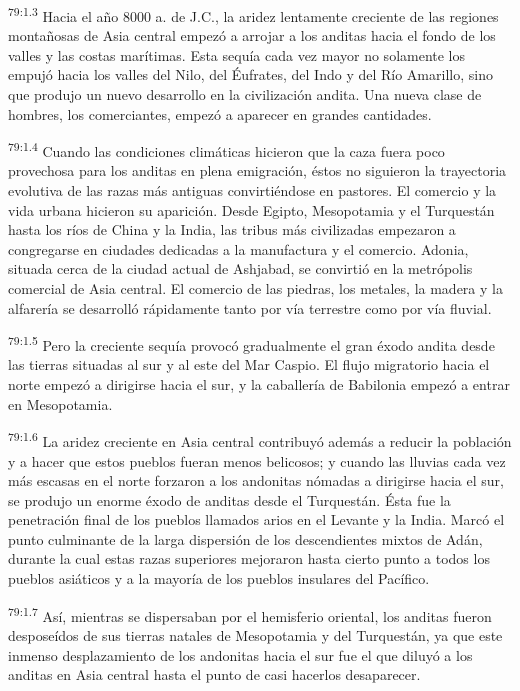 \par
\textsuperscript{79:1.3} Hacia el año 8000 a. de J.C., la aridez lentamente creciente de las regiones montañosas de Asia central empezó a arrojar a los anditas hacia el fondo de los valles y las costas marítimas. Esta sequía cada vez mayor no solamente los empujó hacia los valles del Nilo, del Éufrates, del Indo y del Río Amarillo, sino que produjo un nuevo desarrollo en la civilización andita. Una nueva clase de hombres, los comerciantes, empezó a aparecer en grandes cantidades.

\par
\textsuperscript{79:1.4} Cuando las condiciones climáticas hicieron que la caza fuera poco provechosa para los anditas en plena emigración, éstos no siguieron la trayectoria evolutiva de las razas más antiguas convirtiéndose en pastores. El comercio y la vida urbana hicieron su aparición. Desde Egipto, Mesopotamia y el Turquestán hasta los ríos de China y la India, las tribus más civilizadas empezaron a congregarse en ciudades dedicadas a la manufactura y el comercio. Adonia, situada cerca de la ciudad actual de Ashjabad, se convirtió en la metrópolis comercial de Asia central. El comercio de las piedras, los metales, la madera y la alfarería se desarrolló rápidamente tanto por vía terrestre como por vía fluvial.

\par
\textsuperscript{79:1.5} Pero la creciente sequía provocó gradualmente el gran éxodo andita desde las tierras situadas al sur y al este del Mar Caspio. El flujo migratorio hacia el norte empezó a dirigirse hacia el sur, y la caballería de Babilonia empezó a entrar en Mesopotamia.

\par
\textsuperscript{79:1.6} La aridez creciente en Asia central contribuyó además a reducir la población y a hacer que estos pueblos fueran menos belicosos; y cuando las lluvias cada vez más escasas en el norte forzaron a los andonitas nómadas a dirigirse hacia el sur, se produjo un enorme éxodo de anditas desde el Turquestán. Ésta fue la penetración final de los pueblos llamados arios en el Levante y la India. Marcó el punto culminante de la larga dispersión de los descendientes mixtos de Adán, durante la cual estas razas superiores mejoraron hasta cierto punto a todos los pueblos asiáticos y a la mayoría de los pueblos insulares del Pacífico.

\par
\textsuperscript{79:1.7} Así, mientras se dispersaban por el hemisferio oriental, los anditas fueron desposeídos de sus tierras natales de Mesopotamia y del Turquestán, ya que este inmenso desplazamiento de los andonitas hacia el sur fue el que diluyó a los anditas en Asia central hasta el punto de casi hacerlos desaparecer.


